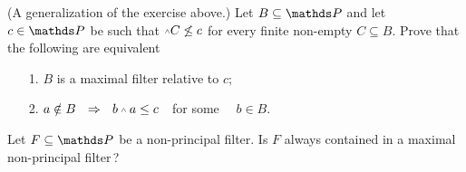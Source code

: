 \documentclass[creche.tex]{subfiles}
\begin{document}
\begin{exercise}
(A generalization of the exercise above.) Let $B\subseteq \PP$ and let $c\in \PP$ be such that $\swedge C\not\le c$ for every finite non-empty $C\subseteq B$.
Prove that the following are equivalent
\begin{itemize}
\item[1.] $B$ is a maximal filter relative to $c$;
\item[2.] $a\notin B\ \ \IMP\ \ b\swedge a \le c$\ \  for some \ \ $b\in B$.\QED
\end{itemize}
\end{exercise}


\begin{exercise}
Let $F\subseteq\PP$ be a non-principal filter.
Is $F$ always contained in a maximal non-principal filter\,?\QED
\end{exercise}



\end{document}

